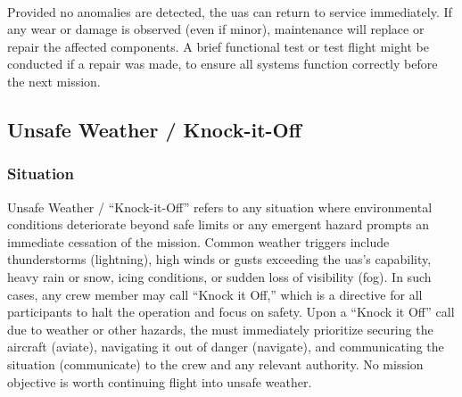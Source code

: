                 \paragraph{} Provided no anomalies are detected, the \ac{uas} can return to service immediately. If any wear or damage is observed (even if minor), maintenance will replace or repair the affected components. A brief functional test or test flight might be conducted if a repair was made, to ensure all systems function correctly before the next mission.
        
        \subsection{Unsafe Weather / Knock-it-Off}\label{ssec:ep-weather}
        
            \subsubsection{Situation}Unsafe Weather / “Knock-it-Off” refers to any situation where environmental conditions deteriorate beyond safe limits or any emergent hazard prompts an immediate cessation of the mission. Common weather triggers include thunderstorms (lightning), high winds or gusts exceeding the \ac{uas}’s capability, heavy rain or snow, icing conditions, or sudden loss of visibility (fog). In such cases, any crew member may call “Knock it Off,” which is a directive for all participants to halt the operation and focus on safety. Upon a “Knock it Off” call due to weather or other hazards, the  must immediately prioritize securing the aircraft (aviate), navigating it out of danger (navigate), and communicating the situation (communicate) to the crew and any relevant authority. No mission objective is worth continuing flight into unsafe weather.
            
